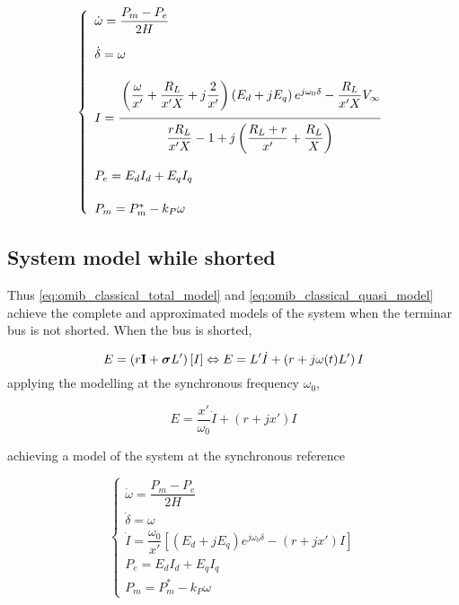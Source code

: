 \begin{equation}
	\left\{\begin{array}{l}
		\dot{\omega} = \dfrac{P_m - P_e}{2H} \\[5mm]
		\dot{\delta} = \omega \\[5mm]
		I = \dfrac{\raisebox{-5mm}{} \left(\dfrac{\omega}{x'} + \dfrac{R_L}{x'X} + j\dfrac{2}{x'}\right)\left(E_d + jE_q\right)e^{j\omega_0\delta} - \dfrac{R_L}{x'X}V_\infty}{\raisebox{6mm}{} \dfrac{rR_L}{x'X} - 1 + j\left(\dfrac{R_L + r}{x'}+ \dfrac{R_L}{X}\right)} \\[12mm]
		P_e = E_dI_d + E_qI_q \\[5mm]
		P_m = P_m^* - k_P\omega
	\end{array}\right. \label{eq:omib_classical_quasi_model}
\end{equation} %

\subsection{System model while shorted} %

	Thus \eqref{eq:omib_classical_total_model} and \eqref{eq:omib_classical_quasi_model} achieve the complete and approximated models of the system when the terminar bus is not shorted. When the bus is shorted,

\begin{equation} E = \left(r\mathbf{I} + \boldsymbol{\sigma} L' \right)\left[I\right] \Leftrightarrow E = L'\dot{I} + \left(r + j\omega(t)L'\right)I \end{equation} \noindent applying the modelling at the synchronous frequency $\omega_0$,

\begin{equation} E = \dfrac{x'}{\omega_0}\dot{I} + \left(r + jx'\right)I \end{equation}

	\noindent achieving a model of the system at the synchronous reference

\begin{equation}
	\left\{\begin{array}{l}
		\dot{\omega} = \dfrac{P_m - P_e}{2H} \\[5mm]
		\dot{\delta} = \omega \\[5mm]
		\dot{I} = \dfrac{\omega_0}{x'}\left[\left(E_d + jE_q\right)e^{j\omega_0\delta} - \left(r + jx'\right)I \right] \\[5mm]
		P_e = E_dI_d + E_qI_q \\[5mm]
		P_m = P_m^* - k_P\omega
	\end{array}\right. \label{eq:omib_classical_short}
\end{equation} %

